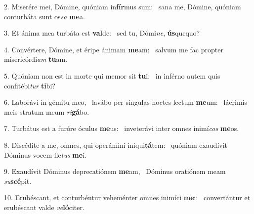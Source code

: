 2. Miserére mei, Dómine, quóniam in\textbf{fír}mus sum: \ast\  sana me, Dómine, quóniam conturbáta sunt os\textit{sa} \textbf{me}a.\

3. Et ánima mea turbáta est \textbf{val}de: \ast\  sed tu, Dómi\textit{ne}, \textbf{ús}quequo?\

4. Convértere, Dómine, et éripe ánimam \textbf{me}am: \ast\  salvum me fac propter misericórdi\textit{am} \textbf{tu}am.\

5. Quóniam non est in morte qui memor sit \textbf{tu}i: \ast\  in inférno autem quis confitébi\textit{tur} \textbf{ti}bi?\

6. Laborávi in gémitu meo, \dag\  lavábo per síngulas noctes lectum \textbf{me}um: \ast\  lácrimis meis stratum meum \textit{ri}\textbf{gá}bo.\

7. Turbátus est a furóre óculus \textbf{me}us: \ast\  inveterávi inter omnes inimí\textit{cos} \textbf{me}os.\

8. Discédite a me, omnes, qui operámini iniqui\textbf{tá}tem: \ast\  quóniam exaudívit Dóminus vocem fle\textit{tus} \textbf{me}i.\

9. Exaudívit Dóminus deprecatiónem \textbf{me}am, \ast\  Dóminus oratiónem meam \textit{su}\textbf{scé}pit.\

10. Erubéscant, et conturbéntur veheménter omnes inimíci \textbf{me}i: \ast\  convertántur et erubéscant valde \textit{ve}\textbf{ló}citer.\

